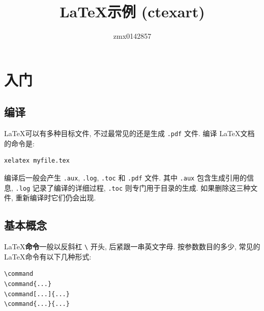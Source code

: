 \documentclass[a4paper]{ctexart}
\title{\LaTeX 示例 (ctexart)}	%
\author{zmx0142857}				%
\begin{document}

\maketitle				%
\newpage				%

\setcounter{tocdepth}{2}%
\tableofcontents		%
\newpage



\section{入门}
\subsection{编译}

\LaTeX 可以有多种目标文件, 不过最常见的还是生成 \texttt{.pdf} 文件.
编译 \LaTeX 文档的命令是:

\begin{verbatim}
xelatex myfile.tex
\end{verbatim}

编译后一般会产生 \texttt{.aux}, \texttt{.log}, \texttt{.toc} 和
\texttt{.pdf} 文件.  其中 \texttt{.aux} 包含生成引用的信息, \texttt{.log}
记录了编译的详细过程, \texttt{.toc} 则专门用于目录的生成.
如果删除这三种文件, 重新编译时它们仍会出现.

\subsection{基本概念}

\LaTeX \textbf{命令}一般以反斜杠 \verb|\| 开头, 后紧跟一串英文字母.
按参数数目的多少, 常见的 \LaTeX 命令有以下几种形式:

\begin{verbatim}
\command
\command{...}
\command[...]{...}
\command{...}{...}
\end{verbatim}
\end{document}

